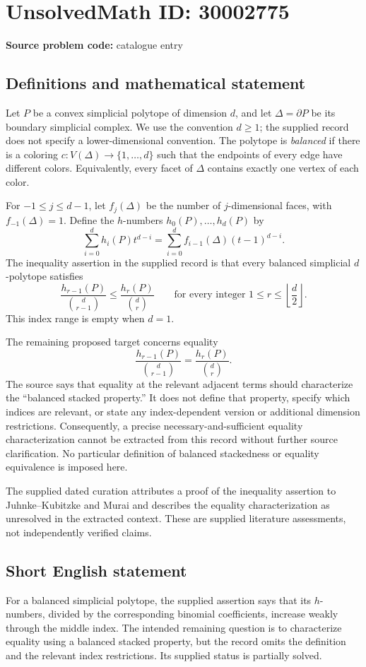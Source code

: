 \documentclass[11pt]{article}
\begin{document}
\section*{UnsolvedMath ID: 30002775}
\textbf{Source problem code:} catalogue entry
\subsection{Definitions and mathematical statement}
Let \(P\) be a convex simplicial polytope of dimension \(d\), and let \(\Delta=\partial P\) be its boundary simplicial complex. We use the convention \(d\geq 1\); the supplied record does not specify a lower-dimensional convention. The polytope is \emph{balanced} if there is a coloring \(c:V(\Delta)\to\{1,\ldots,d\}\) such that the endpoints of every edge have different colors. Equivalently, every facet of \(\Delta\) contains exactly one vertex of each color.

For \(-1\leq j\leq d-1\), let \(f_j(\Delta)\) be the number of \(j\)-dimensional faces, with \(f_{-1}(\Delta)=1\). Define the \(h\)-numbers \(h_0(P),\ldots,h_d(P)\) by
\[
\sum_{i=0}^{d}h_i(P)t^{d-i}
=
\sum_{i=0}^{d}f_{i-1}(\Delta)(t-1)^{d-i}.
\]
The inequality assertion in the supplied record is that every balanced simplicial \(d\)-polytope satisfies
\[
\frac{h_{r-1}(P)}{\binom{d}{r-1}}
\leq
\frac{h_r(P)}{\binom{d}{r}}
\qquad
\text{for every integer }1\leq r\leq\left\lfloor\frac d2\right\rfloor.
\]
This index range is empty when \(d=1\).

The remaining proposed target concerns equality
\[
\frac{h_{r-1}(P)}{\binom{d}{r-1}}
=
\frac{h_r(P)}{\binom{d}{r}}.
\]
The source says that equality at the relevant adjacent terms should characterize the ``balanced stacked property.'' It does not define that property, specify which indices are relevant, or state any index-dependent version or additional dimension restrictions. Consequently, a precise necessary-and-sufficient equality characterization cannot be extracted from this record without further source clarification. No particular definition of balanced stackedness or equality equivalence is imposed here.

The supplied dated curation attributes a proof of the inequality assertion to Juhnke--Kubitzke and Murai and describes the equality characterization as unresolved in the extracted context. These are supplied literature assessments, not independently verified claims.
\subsection{Short English statement}
For a balanced simplicial polytope, the supplied assertion says that its \(h\)-numbers, divided by the corresponding binomial coefficients, increase weakly through the middle index. The intended remaining question is to characterize equality using a balanced stacked property, but the record omits the definition and the relevant index restrictions. Its supplied status is partially solved.
\end{document}

